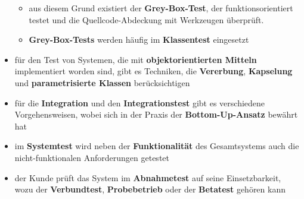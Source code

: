 \begin{itemize}
\begin{itemize}
        \item aus diesem Grund existiert der \textbf{Grey-Box-Test}, der funktionsorientiert testet und die Quellcode-Abdeckung mit Werkzeugen überprüft.
        \item \textbf{Grey-Box-Tests} werden häufig im \textbf{Klassentest} eingesetzt
    \end{itemize}
    \item für den Test von Systemen, die mit \textbf{objektorientierten Mitteln} implementiert worden sind, gibt es Techniken, die \textbf{Vererbung}, \textbf{Kapselung}  und \textbf{parametrisierte Klassen} berücksichtigen
    \item für die \textbf{Integration} und den \textbf{Integrationstest} gibt es verschiedene Vorgehensweisen, wobei sich in der Praxis der \textbf{Bottom-Up-Ansatz} bewährt hat
    \item im \textbf{Systemtest} wird neben der \textbf{Funktionalität} des Gesamtsystems auch die nicht-funktionalen Anforderungen getestet
    \item der Kunde prüft das System im \textbf{Abnahmetest} auf seine Einsetzbarkeit, wozu der \textbf{Verbundtest}, \textbf{Probebetrieb} oder der \textbf{Betatest} gehören kann
\end{itemize}